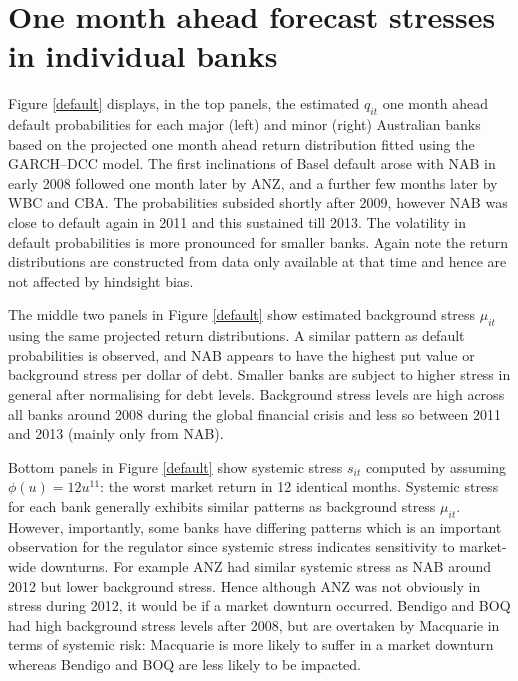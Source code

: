 \documentclass[authoryear]{elsarticle}
\newcommand{\fref}[1]{Figure \ref{#1}}
\begin{document}
\section{One month ahead forecast stresses in individual banks}\label{simulate1}

\fref{default} displays, in the top panels, the estimated $q_{it}$ one month ahead default probabilities for each major (left) and minor (right) Australian banks based on the projected one month ahead return distribution fitted using the GARCH--DCC model.  The first inclinations of Basel default arose with NAB in early 2008 followed one month later by ANZ, and  a further few months later by WBC and CBA. The probabilities subsided shortly after 2009, however NAB was close to default again in 2011 and this sustained till 2013. The volatility in default probabilities is more pronounced for smaller banks. Again note the return distributions are constructed from data only available at that time and hence are not affected by hindsight bias.

The middle two panels in \fref{default} show estimated background stress $\mu_{it}$ using the same projected return distributions. A similar pattern as default probabilities is observed, and NAB appears to have the highest put value or background stress per dollar of debt. Smaller banks are subject to higher stress in general after normalising for debt levels. Background stress levels are high across all banks around 2008 during the global financial crisis and less so between 2011 and 2013 (mainly only from NAB).


Bottom panels in \fref{default} show systemic stress $s_{it}$ computed by assuming $\phi(u)=12u^{11}$: the worst market return in 12 identical months. Systemic stress for each bank generally exhibits similar patterns as background stress $\mu_{it}$. However, importantly, some banks have differing patterns which is an important observation for the regulator since systemic stress indicates sensitivity to market-wide downturns. For example ANZ had similar systemic stress as NAB around 2012 but lower background stress. Hence although ANZ was not obviously in stress during 2012, it would be if a market downturn occurred. Bendigo and BOQ had high background stress levels after 2008, but are overtaken by Macquarie in terms of systemic risk: Macquarie is more likely to suffer in a market downturn whereas Bendigo and BOQ are less likely to be impacted.
\end{document}
